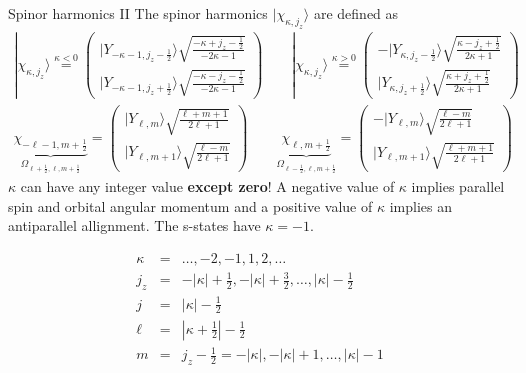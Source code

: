 \documentclass[11pt,a4paper]{report}
\begin{document}
\begin{myshadowminipage}{Spinor harmonics II}
The spinor harmonics $|\chi_{\kappa,j_z}\rangle$ are defined as
\begin{eqnarray}
|\chi_{\kappa,j_z}\rangle
\stackrel{\kappa<0}{=}\left(
\begin{array}{c}
|Y_{-\kappa-1,j_z-\frac{1}{2}}\rangle
\sqrt{\frac{-\kappa+j_z-\frac{1}{2}}{-2\kappa-1}}\\
|Y_{-\kappa-1,j_z+\frac{1}{2}}\rangle
\sqrt{\frac{-\kappa-j_z-\frac{1}{2}}{-2\kappa-1}}\end{array}\right)
\qquad
|\chi_{\kappa,j_z}\rangle
\stackrel{\kappa>0}{=}\left(
\begin{array}{c}
-|Y_{\kappa,j_z-\frac{1}{2}}\rangle
\sqrt{\frac{\kappa-j_z+\frac{1}{2}}{2\kappa+1}}\\
|Y_{\kappa,j_z+\frac{1}{2}}\rangle
\sqrt{\frac{\kappa+j_z+\frac{1}{2}}{2\kappa+1}}\end{array}\right)
\label{eq:spinorharmonicskappa_a}
\\
\underbrace{\chi_{-\ell-1,m+\frac{1}{2}}}_{\Omega_{\ell+\frac{1}{2},\ell,m+\frac{1}{2}}}
=\left(
\begin{array}{c}
|Y_{\ell,m}\rangle\sqrt{\frac{\ell+m+1}{2\ell+1}}\\
|Y_{\ell,m+1}\rangle\sqrt{\frac{\ell-m}{2\ell+1}}\end{array}\right)
\qquad
\underbrace{\chi_{\ell,m+\frac{1}{2}}}_{\Omega_{\ell-\frac{1}{2},\ell,m+\frac{1}{2}}}
=\left(
\begin{array}{c}
-|Y_{\ell,m}\rangle\sqrt{\frac{\ell-m}{2\ell+1}}\\
|Y_{\ell,m+1}\rangle\sqrt{\frac{\ell+m+1}{2\ell+1}}\end{array}\right)
\label{eq:spinorharmonicskappa}
\end{eqnarray}
$\kappa$ can have any integer value \textbf{except zero}!  A negative
value of $\kappa$ implies parallel spin and orbital angular momentum
and a positive value of $\kappa$ implies an antiparallel
allignment. The s-states have $\kappa=-1$.

\begin{eqnarray}
\kappa&=&\ldots,-2,-1,1,2,\ldots
\\
j_z&=&-|\kappa|+\frac{1}{2},-|\kappa|+\frac{3}{2},\ldots,|\kappa|-\frac{1}{2}
\\
j&=&|\kappa|-\frac{1}{2}
\\
\ell&=&|\kappa+\frac{1}{2}|-\frac{1}{2}
\label{eq:lofkappa}
\\
m&=&j_z-\frac{1}{2}=-|\kappa|,-|\kappa|+1,\ldots,|\kappa|-1
\end{eqnarray}



\end{myshadowminipage}
\end{document}
